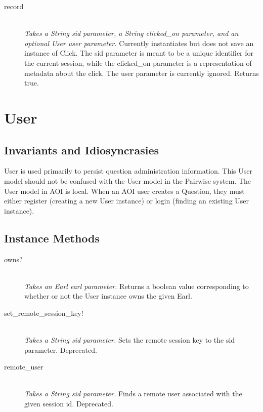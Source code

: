 \documentclass[11pt]{book}
\begin{document}
\begin{description}
	\item[record]  \hfill \\
  \emph{Takes a String sid parameter, a String clicked\_on parameter, and an optional User user parameter.}  Currently instantiates but does not save an instance of Click.  The sid parameter is meant to be a unique identifier for the current session, while the clicked\_on parameter is a representation of metadata about the click.  The user parameter is currently ignored.  Returns true.

\end{description}


\section{User}

\subsection{Invariants and Idiosyncrasies}

User is used primarily to persist question administration information.  This User model should not be confused with the  User model in the Pairwise system.  The User model in AOI is local.  When an AOI user creates a Question, they must either register (creating a new User instance) or login (finding an existing User instance).

\subsection{Instance Methods}

\begin{description}
  
  \item[owns?]  \hfill \\
  \emph{Takes an Earl earl parameter.} Returns a boolean value corresponding to whether or not the User instance owns the given Earl.
  
	\item[set\_remote\_session\_key!]  \hfill \\
  \emph{Takes a String sid parameter.}  Sets the remote session key to the sid parameter.  Deprecated.

	\item[remote\_user]  \hfill \\
  \emph{Takes a String sid parameter.} Finds a remote user associated with the given session id.  Deprecated.

\end{description}
\end{document}
